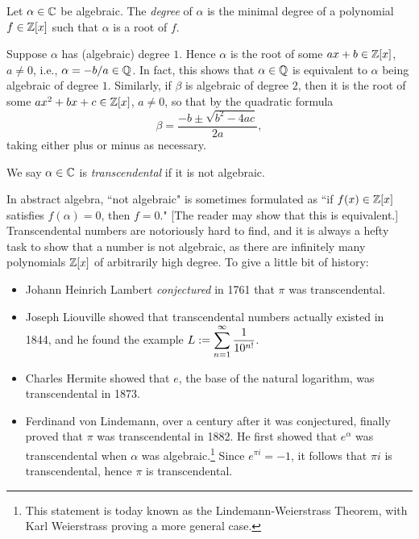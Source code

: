 \documentclass{article}
\begin{document}
\begin{definition}
Let $\alpha\in\mathbb C$ be algebraic. The \textit{degree} of $\alpha$ is the minimal degree of a polynomial $f\in \mathbb Z[x]$ such that $\alpha$ is a root of $f$.
\end{definition}

\begin{example}
Suppose $\alpha$ has (algebraic) degree $1$. Hence $\alpha$ is the root of some $ax + b\in\mathbb Z[x]$, $a\neq 0$, i.e., $\alpha = -b/a\in\mathbb Q$. In fact, this shows that $\alpha\in \mathbb Q$ is equivalent to $\alpha$ being algebraic of degree $1$. Similarly, if $\beta$ is algebraic of degree $2$, then it is the root of some $ax^2+bx+c\in \mathbb Z[x]$, $a\neq 0$, so that by the quadratic formula
$$\beta = \frac{-b\pm \sqrt{b^2-4ac}}{2a},$$
taking either plus or minus as necessary.
\end{example}

\begin{definition}
We say $\alpha\in\mathbb C$ is \textit{transcendental} if it is not algebraic.
\end{definition}
In abstract algebra, ``not algebraic" is sometimes formulated as ``if $f(x)\in \mathbb Z[x]$ satisfies $f(\alpha) = 0$, then $f = 0$." [The reader may show that this is equivalent.] Transcendental numbers are notoriously hard to find, and it is always a hefty task to show that a number is not algebraic, as there are infinitely many polynomials $\mathbb Z[x]$ of arbitrarily high degree. To give a little bit of history:
\begin{itemize}
    \item Johann Heinrich Lambert \textit{conjectured} in 1761 that $\pi$ was transcendental.
    \item Joseph Liouville showed that transcendental numbers actually existed in 1844, and he found the example $L := \displaystyle\sum_{n=1}^\infty \frac 1{10^{n!}}$.
    \item Charles Hermite showed that $e$, the base of the natural logarithm, was transcendental in 1873.
    \item Ferdinand von Lindemann, over a century after it was conjectured, finally proved that $\pi$ was transcendental in 1882. He first showed that $e^\alpha$ was transcendental when $\alpha$ was algebraic.\footnote{This statement is today known as the Lindemann-Weierstrass Theorem, with Karl Weierstrass proving a more general case.} Since $e^{\pi i} = -1$, it follows that $\pi i$ is transcendental, hence $\pi$ is transcendental.
\end{itemize}
\end{document}
